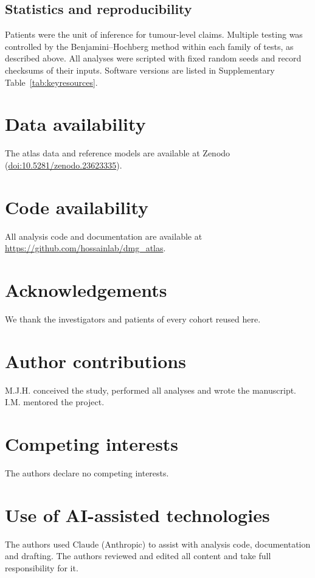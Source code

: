 \documentclass[11pt,a4paper]{article}
\begin{document}
\subsection{Statistics and reproducibility}
Patients were the unit of inference for tumour-level claims. Multiple testing was controlled by the Benjamini--Hochberg method within each family of tests, as described above.
All analyses were scripted with fixed random seeds and record checksums of their inputs. Software versions are listed in
Supplementary Table~\ref{tab:keyresources}.

\section{Data availability}
The atlas data and reference models are available at Zenodo
(\href{https://doi.org/10.5281/zenodo.23623335}{doi:10.5281/zenodo.23623335}).

\section{Code availability}
All analysis code and documentation are available at \url{https://github.com/hossainlab/dmg_atlas}.

\section{Acknowledgements}
We thank the investigators and patients of every cohort reused here.

\section{Author contributions}
M.J.H. conceived the study, performed all analyses and wrote the manuscript. I.M. mentored the project.

\section{Competing interests}
The authors declare no competing interests.

\section{Use of AI-assisted technologies}
The authors used Claude (Anthropic) to assist with analysis code, documentation and
drafting. The authors reviewed and edited all content and take full responsibility for it.
\end{document}
